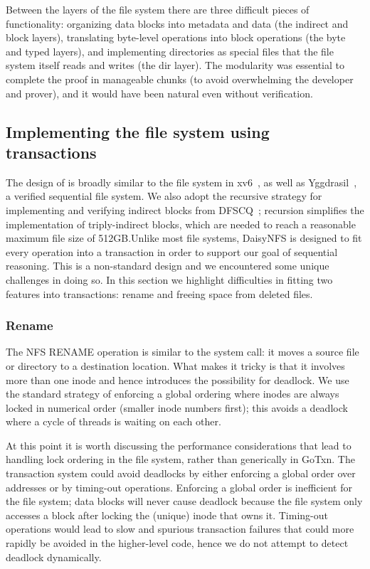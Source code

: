 Between the layers of the file system
there are three difficult pieces of
functionality: organizing data blocks into metadata and data (the
indirect and block layers), translating byte-level operations into
block operations (the byte and typed layers), and implementing
directories as special files that the file system itself reads and
writes (the dir layer). The modularity was essential to complete the proof in
manageable chunks (to avoid overwhelming the developer and prover), and it would
have been natural even without verification.

\subsection{Implementing the file system using transactions}

The design of \sys is broadly similar to the file system in xv6~\cite{xv6},
as well as Yggdrasil~\cite{sigurbjarnarson:yggdrasil}, a verified sequential
file system. We also adopt the recursive strategy for implementing and
verifying indirect blocks from DFSCQ~\cite{akonradi-meng}; recursion simplifies
the implementation of triply-indirect blocks, which are needed to reach a
reasonable maximum file size of 512GB.\@ Unlike most file systems, DaisyNFS is designed
to fit every operation into a transaction in order to support our goal of
sequential reasoning. This is a non-standard design and we encountered some
unique challenges in doing so. In this section we highlight difficulties in
fitting two features into transactions: rename and freeing space from deleted
files.

\subsubsection{Rename}
\label{sec:dafny:rename}

The NFS RENAME operation is similar to the  system call: it moves a
source file or directory to a destination location. What makes it tricky is that
it involves more than one inode and hence introduces the possibility for
deadlock.
We
use the standard strategy of enforcing a global ordering where inodes are always
locked in numerical order (smaller inode numbers first); this avoids a deadlock
where a cycle of threads is waiting on each other.

At this point it is worth discussing the performance considerations that lead to
handling lock ordering in the file
system, rather than generically in GoTxn. The transaction system could
avoid deadlocks by either enforcing a global order over addresses or by
timing-out operations. Enforcing a global order is inefficient for the file
system; data blocks will never cause deadlock because the file system only
accesses a block after locking the (unique) inode that owns it. Timing-out
operations would lead to slow and spurious transaction failures that could more
rapidly be avoided in the higher-level code, hence we do not attempt to detect
deadlock dynamically.


